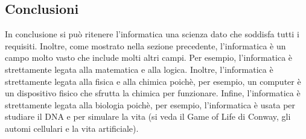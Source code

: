 \subsection{Conclusioni}

In conclusione si può ritenere l'informatica una scienza dato che soddisfa tutti i requisiti. Inoltre, come mostrato nella sezione precedente, l'informatica è un campo molto vasto che include molti altri campi. Per esempio, l'informatica è strettamente 
legata alla matematica e alla logica. Inoltre, l'informatica è strettamente legata alla fisica e alla chimica poichè, per esempio, un computer è un dispositivo fisico che sfrutta la chimica per funzionare. Infine, l'informatica è strettamente legata alla 
biologia poichè, per esempio, l'informatica è usata per studiare il DNA e per simulare la vita (si veda il Game of Life di Conway, gli automi cellulari e la vita artificiale).